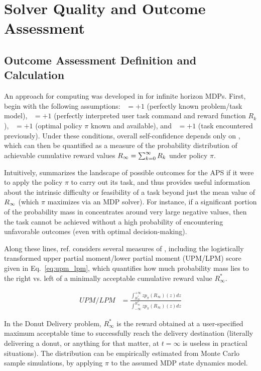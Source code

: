 \section{Solver Quality and Outcome Assessment}
    
\subsection{Outcome Assessment Definition and Calculation} \label{sec:xO}
An approach for computing \xO{} was developed in \cite{Aitken2016-cv} for infinite horizon MDPs. First, begin with the following assumptions: \xM~$=+1$ (perfectly known problem/task model), \xI~$= +1$ (perfectly interpreted user task command and reward function $R_k$), \xQ~$=+1$ (optimal policy $\pi$ known and available), and \xP~$=+1$ (task encountered previously). Under these conditions, overall self-confidence depends only on \xO{}, which can then be quantified as a measure of the probability distribution \ppiri of achievable cumulative reward values $R_{\infty}= \sum_{k=0}^{\infty}R_{k}$ under policy $\pi$.

Intuitively, \ppiri summarizes the landscape of possible outcomes for the APS if it were to apply the policy $\pi$ to carry out its task, and thus provides useful information about the intrinsic difficulty or feasibility of a task beyond just the mean value of $R_{\infty}{}$ (which $\pi$ maximizes via an MDP solver). For instance, if a significant portion of the probability mass in \ppiri concentrates around very large negative values, then the task cannot be achieved without a high probability of encountering unfavorable outcomes (even with optimal decision-making). 

Along these lines, ref. \cite{Aitken2016-cv} considers several measures of \ppiri, including the logistically transformed upper partial moment/lower partial moment (UPM/LPM) score given in Eq.~\ref{eq:upm_lpm}, which quantifies how much probability mass lies to the right vs. left of a minimally acceptable cumulative reward value $R^*_{\infty}$.

    \begin{align}
        UPM/LPM &= \frac{\int_{R^*_{\infty}}^{+\infty}zp_{\pi}(R_{\infty})(z)dz}{\int_{-\infty}^{R^*_{\infty}} zp_{\pi}(R_{\infty})(z)dz} \label{eq:upm_lpm}
    \end{align}

In the Donut Delivery problem, $R^*_{\infty}$ is the reward obtained at a user-specified maximum acceptable time to successfully reach the delivery destination (literally delivering a donut, or anything for that matter, at $t=\infty$ is useless in practical situations). The distribution \ppiri can be empirically estimated from Monte Carlo sample simulations, by applying $\pi$ to the assumed MDP state dynamics model.

